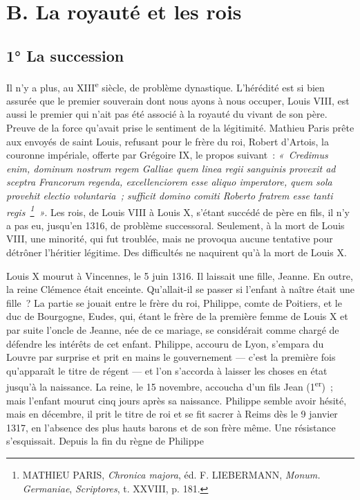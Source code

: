 \documentclass[french,twoside]{book} %
\begin{document}
\section[{B. La royauté et les rois}]{B. La royauté et les rois}
\label{c03b}
\subsection[{1° La succession}]{1° La succession}
\label{c03b1}
\noindent Il n’y a plus, au XIII\textsuperscript{e} siècle, de problème dynastique. L’hérédité est si bien assurée que le premier souverain dont nous ayons à nous occuper, Louis VIII, est aussi le premier qui n’ait pas été associé à la royauté du vivant de son père. Preuve de la force qu’avait prise le sentiment de la légitimité. Mathieu Paris prête aux envoyés de saint Louis, refusant pour le frère du roi, Robert d’Artois, la couronne impériale, offerte par Grégoire IX, le propos suivant : \emph{« Credimus enim, dominum nostrum regem Galliae quem linea regii sanguinis provexit ad sceptra Francorum regenda, excellenciorem esse aliquo imperatore, quem sola provehit electio voluntaria ; sufficit domino comiti Roberto fratrem esse tanti regis \footnote{ MATHIEU PARIS, {\itshape Chronica majora}, éd. F. LIEBERMANN, {\itshape Monum. Germaniae}, {\itshape Scriptores}, t. XXVIII, p. 181.} »}. Les rois, de Louis VIII à Louis X, s’étant succédé de père en fils, il n’y a pas eu, jusqu’en 1316, de problème successoral. Seulement, à la mort de Louis VIII, une minorité, qui fut troublée, mais ne provoqua aucune tentative pour détrôner l’héritier légitime. Des difficultés ne naquirent qu’à la mort de Louis X.\par
Louis X mourut à Vincennes, le 5 juin 1316. Il laissait une fille, Jeanne. En outre, la reine Clémence était enceinte. Qu’allait-il se passer si l’enfant à naître était une fille ? La partie se jouait entre le frère du roi, Philippe, comte de Poitiers, et le duc de Bourgogne, Eudes, qui, étant le frère de la première femme de Louis X et par suite l’oncle de Jeanne, née de ce mariage, se considérait comme chargé de défendre les intérêts de cet enfant. Philippe, accouru de Lyon, s’empara du Louvre par surprise et prit en mains le gouvernement — c’est la première fois qu’apparaît le titre de régent — et l’on s’accorda à laisser les choses en état jusqu’à la naissance. La reine, le 15 novembre, accoucha d’un fils Jean (1\textsuperscript{er}) ; mais l’enfant mourut cinq jours après sa naissance. Philippe semble avoir hésité, mais en décembre, il prit le titre de roi et se fit sacrer à Reims dès le 9 janvier 1317, en l’absence des plus hauts barons et de son frère même. Une résistance s’esquissait. Depuis la fin du règne de Philippe  
\end{document}
